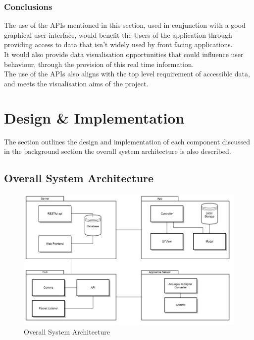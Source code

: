 \documentclass[preprint,12pt,3p]{elsarticle}
\begin{document}
\subsubsection{Conclusions}
The use of the APIs mentioned in this section, used in conjunction with a good graphical user interface, would benefit the Users of the application through providing access to data that isn't widely used by front facing applications.\\
It would also provide data visualisation opportunities that could influence user behaviour, through the provision of this real time information.\\
The use of the APIs also aligns with the top level requirement of accessible data, and meets the visualisation aims of the project.




\clearpage

\section{Design \& Implementation}
The section outlines the design and implementation of each component discussed in the background section the overall system architecture is also described.

\subsection{Overall System Architecture}
\begin{figure}[H]
    \includegraphics[width=\columnwidth]{diagrams/Architecture}
    \caption {Overall System Architecture}
    \label{fig:systemarchoverall}
\end{figure}
\end{document}
